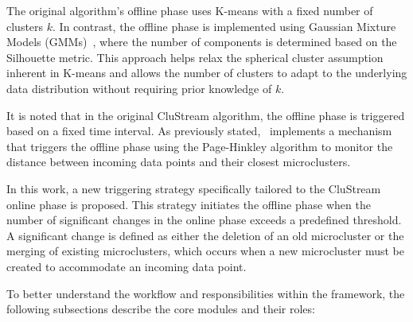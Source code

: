 The original algorithm's offline phase uses K-means with a fixed number of
clusters $ k $. In contrast, the offline phase is implemented using Gaussian
Mixture Models (GMMs)~\cite{gaussian_mixtures}, where the number of components
is determined based on the Silhouette metric. This approach helps relax the
spherical cluster assumption inherent in K-means and allows the number of
clusters to adapt to the underlying data distribution without requiring prior
knowledge of $ k $.

It is noted that in the original CluStream algorithm, the offline phase is
triggered based on a fixed time interval. As previously
stated,~\cite{namitha_dynamic_clustering_2} implements a mechanism that
triggers the offline phase using the Page-Hinkley algorithm to monitor the
distance between incoming data points and their closest microclusters.

In this work, a new triggering strategy specifically tailored to the CluStream
online phase is proposed. This strategy initiates the offline phase when the
number of significant changes in the online phase exceeds a predefined
threshold. A significant change is defined as either the deletion of an old
microcluster or the merging of existing microclusters, which occurs when a new
microcluster must be created to accommodate an incoming data point.

To better understand the workflow and responsibilities within the framework,
the following subsections describe the core modules and their roles:


